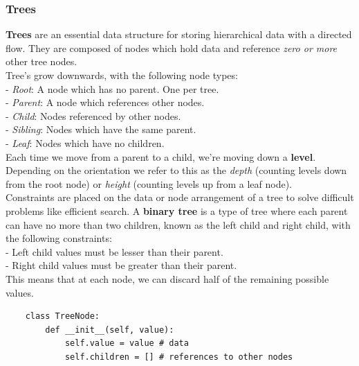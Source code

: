 \documentclass[11pt, a4paper]{article}
\begin{document}
\begin{spacing}{1.1}
	\subsubsection{Trees}
	\textbf{Trees} are an essential data structure for storing hierarchical data with a directed flow. They are composed of nodes which hold data and reference \textit{zero or more} other tree nodes. \vspace*{2mm} \\
	Tree's grow downwards, with the following node types: \\ 
	\hspace*{2mm} - \textit{Root}: A node which has no parent. One per tree. \\
	\hspace*{2mm} - \textit{Parent}: A node which references other nodes. \\
	\hspace*{2mm} - \textit{Child}: Nodes referenced by other nodes. \\
	\hspace*{2mm} - \textit{Sibling}: Nodes which have the same parent. \\
	\hspace*{2mm} - \textit{Leaf}: Nodes which have no children. \vspace*{2mm} \\
	Each time we move from a parent to a child, we’re moving down a \textbf{level}. Depending on the orientation we refer to this as the \textit{depth} (counting levels down from the root node) or \textit{height} (counting levels up from a leaf node). \vspace*{2mm} \\
	Constraints are placed on the data or node arrangement of a tree to solve difficult problems like efficient search.	A \textbf{binary tree} is a type of tree where each parent can have no more than two children, known as the left child and right child, with the following constraints: \\
	\hspace*{2mm} - Left child values must be lesser than their parent. \\
	\hspace*{2mm} - Right child values must be greater than their parent. \\
	This means that at each node, we can discard half of the remaining possible values.
	\begin{lstlisting}
	class TreeNode:
		def __init__(self, value):
			self.value = value # data
			self.children = [] # references to other nodes
		

\end{lstlisting}
\end{spacing}
\end{document}

